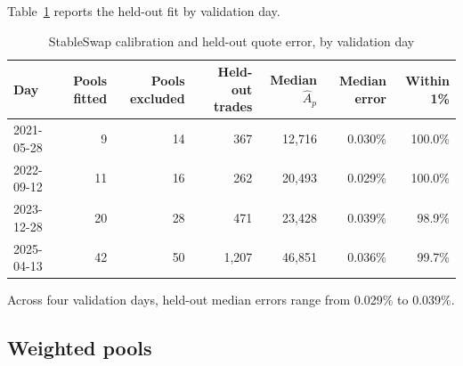 Table~\ref{tab:app:curve} reports the held-out fit by validation day.

\begin{table}[t]
\centering
\caption{StableSwap calibration and held-out quote error, by validation day}
\label{tab:app:curve}
\scriptsize
\begin{tabular}{lrrrrrr}
\toprule
Day & Pools fitted & Pools excluded & Held-out trades & Median $\widehat A_p$ & Median error & Within 1\% \\
\midrule
2021-05-28 & 9 & 14 & 367 & 12{,}716 & 0.030\% & 100.0\% \\
2022-09-12 & 11 & 16 & 262 & 20{,}493 & 0.029\% & 100.0\% \\
2023-12-28 & 20 & 28 & 471 & 23{,}428 & 0.039\% & 98.9\% \\
2025-04-13 & 42 & 50 & 1{,}207 & 46{,}851 & 0.036\% & 99.7\% \\
\bottomrule
\end{tabular}
\end{table}

Across four validation days, held-out median errors range from 0.029\% to 0.039\%.

\subsection{Weighted pools}
\label{app:quoters:weighted}

